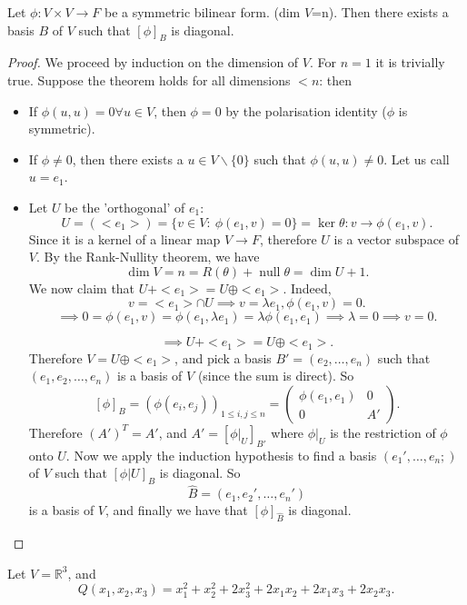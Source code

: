 \documentclass[a4paper]{scrartcl}
\begin{document}
\begin{theorem}
     Let $\phi: V \times V \rightarrow F$ be a symmetric bilinear form. (dim $V$=n). Then there exists a basis $B$ of $V$ such that $[\phi]_B$ is diagonal.
\end{theorem}
\begin{proof}
     We proceed by induction on the dimension of $V$. For $n=1$ it is trivially true. Suppose the theorem holds for all dimensions $<n$: then
     \begin{itemize}
         \item If $\phi (u,u)=0 \forall u \in V$, then $\phi=0$ by the polarisation identity ($\phi $ is symmetric).
         \item If $\phi \neq 0$, then there exists a $u \in V \backslash \{0\}$ such that $\phi (u,u) \neq 0$. Let us call $u=e_1$.
         \item Let $U$ be the 'orthogonal' of $e_1$: 
         \[U=(<e_1>)=\{v \in V: \ \phi (e_1,v)=0\}=\operatorname{ker} \theta: v \rightarrow \phi (e_1,v).\]
         Since it is a kernel of a linear map $V \rightarrow F$, therefore $U$ is a vector subspace of $V$. By the Rank-Nullity theorem, we have 
         \[\operatorname{dim} V=n= R(\theta)+ \operatorname{null}  \theta=\operatorname{dim}U+1.\]
         We now claim that $U+<e_1>=U \oplus <e_1>$. Indeed, 
         \[v= <e_1> \cap U \implies v= \lambda e_1, \phi(e_1,v)=0 .\]
         \[\implies 0=\phi (e_1,v)=\phi (e_1, \lambda e_1)=\lambda \phi (e_1,e_1) \implies \lambda=0 \implies v=0.\]
         
         \[\implies U+<e_1>=U \oplus <e_1>.\]
         Therefore $V=U \oplus <e_1>$, and pick a basis $B'=(e_2, \ldots ,e_n)$ such that $(e_1, e_2, \ldots , e_n)$ is a basis of $V$ (since the sum is direct). So 
         \[[\phi]_B=(\phi(e_i,e_j))_{1 \leq i,j \leq n}=\begin{pmatrix}
         \phi (e_1,e_1) &0\\0&A'
         \end{pmatrix}
         .\]
         Therefore $(A')^T=A'$, and 
         $A'=[\phi|_U]_{B'}$ where $\phi|_U$ is the restriction of $\phi$ onto $U$. Now we apply the induction hypothesis to find a basis $(e_1', \ldots ,e_n;)$ of $V$ such that $[\phi|U]_{B}$ is diagonal. So 
         \[\hat{B}=(e_1,e_2',\ldots ,e_n')\] is a basis of $V$, and finally we have that $[\phi]_{\hat{B}}$ is diagonal.      
     \end{itemize}
\end{proof}

\begin{example}
     Let $V=\mathbb{R}^{3}$, and 
     \[Q(x_1,x_2,x_3)=x_1^2+x_2^2+2x_3^2+2x_1x_2+2x_1x_3+2x_2x_3.\]
     
\end{example}
\end{document}
